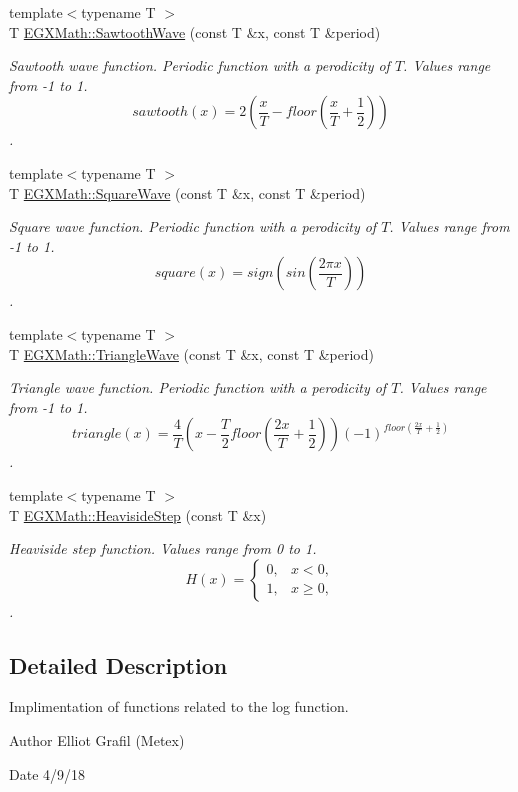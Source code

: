 \begin{DoxyCompactItemize}
\item 
{\footnotesize template$<$typename T $>$ }\\T \mbox{\hyperlink{group___e_g_x_math-_functions-_periodic_ga3eab4a0455f64881f9c183987682d85c}{E\+G\+X\+Math\+::\+Sawtooth\+Wave}} (const T \&x, const T \&period)
\begin{DoxyCompactList}\small\item\em Sawtooth wave function. Periodic function with a perodicity of $T$. Values range from -\/1 to 1. \[sawtooth(x)=2(\frac{x}{T} - floor(\frac{x}{T} + \frac{1}{2}))\]. \end{DoxyCompactList}\item 
{\footnotesize template$<$typename T $>$ }\\T \mbox{\hyperlink{group___e_g_x_math-_functions-_periodic_ga3bdc6c02d347f48f91bca886448db33a}{E\+G\+X\+Math\+::\+Square\+Wave}} (const T \&x, const T \&period)
\begin{DoxyCompactList}\small\item\em Square wave function. Periodic function with a perodicity of $T$. Values range from -\/1 to 1. \[square(x)= sign( sin (\frac{2 \pi x}{T})) \]. \end{DoxyCompactList}\item 
{\footnotesize template$<$typename T $>$ }\\T \mbox{\hyperlink{group___e_g_x_math-_functions-_periodic_gafa81ebd66ef7cd080370fad972d6ac50}{E\+G\+X\+Math\+::\+Triangle\+Wave}} (const T \&x, const T \&period)
\begin{DoxyCompactList}\small\item\em Triangle wave function. Periodic function with a perodicity of $T$. Values range from -\/1 to 1. \[triangle(x)= \frac{4}{T}(x-\frac{T}{2} floor(\frac{2 x}{T}+\frac{1}{2}) )(-1)^{floor(\frac{2 x}{T}+\frac{1}{2})} \]. \end{DoxyCompactList}\item 
{\footnotesize template$<$typename T $>$ }\\T \mbox{\hyperlink{group___e_g_x_math-_functions-_periodic_ga0fb325d5423606e9c222e1ebd6a65833}{E\+G\+X\+Math\+::\+Heaviside\+Step}} (const T \&x)
\begin{DoxyCompactList}\small\item\em Heaviside step function. Values range from 0 to 1. \[H(x)=\begin{cases} 0, & x < 0, \\ 1, & x \ge 0, \end{cases} \]. \end{DoxyCompactList}\end{DoxyCompactItemize}


\subsection{Detailed Description}
Implimentation of functions related to the log function. 

\begin{DoxyAuthor}{Author}
Elliot Grafil (Metex) 
\end{DoxyAuthor}
\begin{DoxyDate}{Date}
4/9/18 
\end{DoxyDate}
